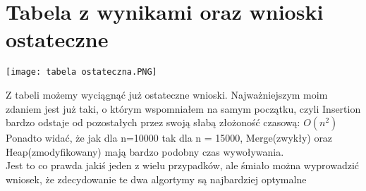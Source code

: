 \documentclass[12pt,a4paper]{article}
\begin{document}
\section{Tabela z wynikami oraz wnioski ostateczne}
\begin{center}
    \texttt{[image: tabela ostateczna.PNG]}
\end{center}
Z tabeli możemy wyciągnąć już ostateczne wnioski. Najważniejszym moim zdaniem jest już taki, o którym wspomniałem na samym początku, czyli Insertion bardzo odstaje od pozostałych przez swoją słabą złożoność czasową: $O(n^2)$\\
Ponadto widać, że jak dla n=10000 tak dla n = 15000, Merge(zwykły) oraz Heap(zmodyfikowany) mają bardzo podobny czas wywoływania.\\
Jest to co prawda jakiś jeden z wielu przypadków, ale śmiało można wyprowadzić wniosek, że zdecydowanie te dwa algortymy są najbardziej optymalne
\end{document}
